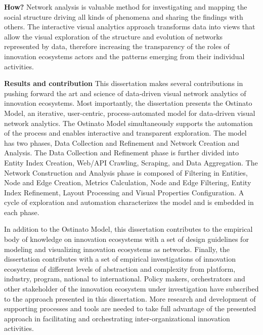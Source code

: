 \textbf{How?}
Network analysis is valuable method for investigating and mapping the social structure driving all kinds of phenomena and sharing the findings with others. The interactive visual analytics approach transforms data into views that allow the visual exploration of the structure and evolution of networks represented by data, therefore increasing the transparency of the roles of innovation ecosystems actors and the patterns emerging from their individual activities. 

\textbf{Results and contribution} This dissertation makes several contributions in pushing forward the art and science of data-driven visual network analytics of innovation ecosystems. Most importantly, the dissertation presents the Ostinato Model, an iterative, user-centric, process-automated model for data-driven visual network analytics. The Ostinato Model simultaneously supports the automation of the process and enables interactive and transparent exploration. The model has two phases, Data Collection and Refinement and Network Creation and Analysis. The Data Collection and Refinement phase is further divided into Entity Index Creation, Web/API Crawling, Scraping, and Data Aggregation. The Network Construction and Analysis phase is composed of Filtering in Entities, Node and Edge Creation, Metrics Calculation, Node and Edge Filtering, Entity Index Refinement, Layout Processing and Visual Properties Configuration. A cycle of exploration and automation characterizes the model and is embedded in each phase.

In addition to the Ostinato Model, this dissertation contributes to the empirical body of knowledge on innovation ecosystems with a set of design guidelines for modeling and visualizing innovation ecosystems as networks. Finally, the dissertation contributes with a set of empirical investigations of innovation ecosystems of different levels of abstraction and complexity from platform, industry, program, national to international. Policy makers, orchestrators and other stakeholder of the innovation ecosystem under investigation have subscribed to the approach presented in this dissertation. More research and development of supporting processes and tools are needed to take full advantage of the presented approach in facilitating and orchestrating inter-organizational innovation activities. 